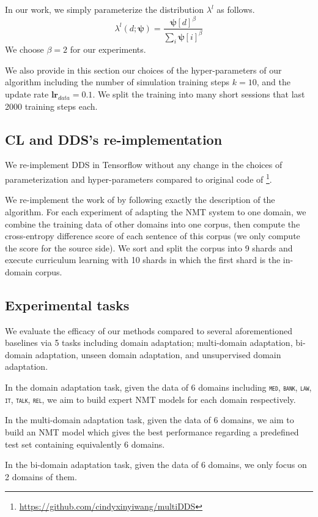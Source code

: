 \documentclass[11pt]{article}
\newcommand{\domain}[1]{\texttt{\textsc{#1}}}
\newcommand{\vpsi}{\ensuremath{\boldsymbol\psi}\xspace} %
\begin{document}
In our work, we simply parameterize the distribution $\lambda^l$ as follows.
\begin{equation}
\lambda
^l(d;\vpsi) = \frac{\vpsi[d]^\beta}{\sum_i \vpsi[i]^\beta} \nonumber
\end{equation}
We choose $\beta=2$ for our experiments.

We also provide in this section our choices of the hyper-parameters of our algorithm including the number of simulation training steps $k=10$, and the update rate $\mathbf{lr}_{data}=0.1$. We split the training into many short sessions that last 2000 training steps each.
\subsection{CL and DDS's re-implementation}
We re-implement DDS in Tensorflow without any change in the choices of parameterization and hyper-parameters compared to original code of \citet{Wang20balancing} \footnote{\url{https://github.com/cindyxinyiwang/multiDDS}}.

We re-implement the work of \citet{Zhang19curriculum} by following exactly the description of the algorithm. For each experiment of adapting the NMT system to one domain, we combine the training data of other domains into one corpus, then compute the cross-entropy difference score of each sentence of this corpus (we only compute the score for the source side). We sort and split the corpus into 9 shards and execute curriculum learning with 10 shards in which the first shard is the in-domain corpus.
\subsection{Experimental tasks}
We evaluate the efficacy of our methods compared to several aforementioned baselines via 5 tasks including domain adaptation; multi-domain adaptation, bi-domain adaptation, unseen domain adaptation, and unsupervised domain adaptation.

In the domain adaptation task, given the data of 6 domains including \domain{med}, \domain{bank}, \domain{law}, \domain{it}, \domain{talk}, \domain{rel}, we aim to build expert NMT models for each domain respectively.

In the multi-domain adaptation task, given the data of 6 domains, we aim to build an NMT model which gives the best performance regarding a predefined test set containing equivalently 6 domains.

In the bi-domain adaptation task, given the data of 6 domains, we only focus on 2 domains of them.
\end{document}

